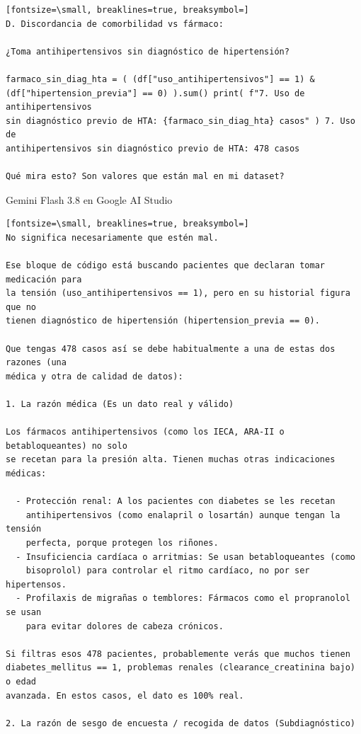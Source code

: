 \documentclass[12pt,a4paper,oneside]{book}
\begin{document}
\begin{iaprompt}
\begin{Verbatim}[fontsize=\small, breaklines=true, breaksymbol=]
D. Discordancia de comorbilidad vs fármaco:

¿Toma antihipertensivos sin diagnóstico de hipertensión?

farmaco_sin_diag_hta = ( (df["uso_antihipertensivos"] == 1) &
(df["hipertension_previa"] == 0) ).sum() print( f"7. Uso de antihipertensivos
sin diagnóstico previo de HTA: {farmaco_sin_diag_hta} casos" ) 7. Uso de
antihipertensivos sin diagnóstico previo de HTA: 478 casos

Qué mira esto? Son valores que están mal en mi dataset?
\end{Verbatim}
\end{iaprompt}
\begin{iaresp}{Gemini Flash 3.8 en Google AI Studio}
\begin{Verbatim}[fontsize=\small, breaklines=true, breaksymbol=]
No significa necesariamente que estén mal.

Ese bloque de código está buscando pacientes que declaran tomar medicación para
la tensión (uso_antihipertensivos == 1), pero en su historial figura que no
tienen diagnóstico de hipertensión (hipertension_previa == 0).

Que tengas 478 casos así se debe habitualmente a una de estas dos razones (una
médica y otra de calidad de datos):

1. La razón médica (Es un dato real y válido)

Los fármacos antihipertensivos (como los IECA, ARA-II o betabloqueantes) no solo
se recetan para la presión alta. Tienen muchas otras indicaciones médicas:

  - Protección renal: A los pacientes con diabetes se les recetan
    antihipertensivos (como enalapril o losartán) aunque tengan la tensión
    perfecta, porque protegen los riñones.
  - Insuficiencia cardíaca o arritmias: Se usan betabloqueantes (como
    bisoprolol) para controlar el ritmo cardíaco, no por ser hipertensos.
  - Profilaxis de migrañas o temblores: Fármacos como el propranolol se usan
    para evitar dolores de cabeza crónicos.

Si filtras esos 478 pacientes, probablemente verás que muchos tienen
diabetes_mellitus == 1, problemas renales (clearance_creatinina bajo) o edad
avanzada. En estos casos, el dato es 100% real.

2. La razón de sesgo de encuesta / recogida de datos (Subdiagnóstico)


\end{Verbatim}
\end{iaresp}
\end{document}
